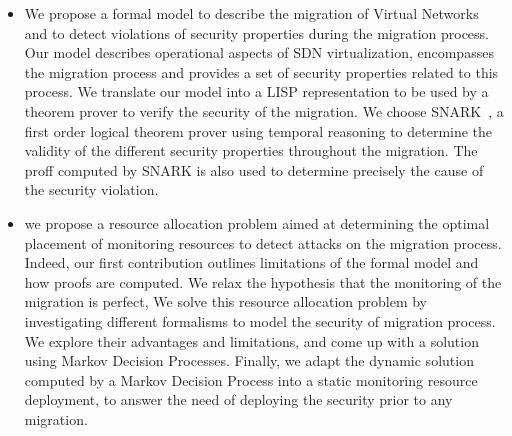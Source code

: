 \begin{itemize}
    \item We propose a formal model to describe the migration of Virtual Networks and to detect violations of security properties during the migration process.
    Our model describes operational aspects of SDN virtualization, encompasses the migration process and provides a set of security properties related to this process. We translate our model into a LISP representation to be used by a theorem prover to verify the security of the migration. We choose SNARK~\cite{snark-Stickel2000}, a first order logical theorem prover using temporal reasoning to determine the validity of the different security properties throughout the migration. The proff computed by SNARK is also used to determine precisely the cause of the security violation.
    
    \item  we propose a resource allocation problem aimed at determining the optimal placement of monitoring resources to detect attacks on the migration process. Indeed, our first contribution outlines limitations of the formal model and how proofs are computed. We relax the hypothesis that the monitoring of the migration is perfect, We solve this resource allocation problem by investigating different formalisms to model the security of migration process. We explore their advantages and limitations, and come up with a solution using Markov Decision Processes. Finally, we adapt the dynamic solution computed by a Markov Decision Process into a static monitoring resource deployment, to answer the need of deploying the security prior to any migration.
\end{itemize}


